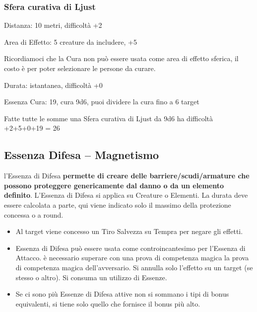 \documentclass[a4paper,11pt,twoside,openany]{book}
\begin{document}
\subsubsection{Sfera curativa di Ljust}

Distanza: 10 metri, difficoltà +2

Area di Effetto: 5 creature da includere, +5

Ricordiamoci che la Cura non può essere usata come area di effetto sferica, il costo è per poter selezionare le persone da curare.

Durata: istantanea, difficoltà +0

Essenza Cura: 19, cura 9d6, puoi dividere la cura fino a 6 target

Fatte tutte le somme una Sfera curativa di Ljust da 9d6 ha difficoltà +2+5+0+19 = 26

\pagebreak

\subsection{Essenza Difesa -- Magnetismo}

\label{essenza-difesa---magnetismo}

l'Essenza di Difesa \textbf{permette di creare delle barriere/scudi/armature che possono proteggere genericamente dal danno o da un elemento definito}. L'Essenza di Difesa si applica su Creature o Elementi. La durata deve essere calcolata a parte, qui viene indicato solo il massimo della protezione concessa o a round.
\begin{itemize}
\item 
Al target viene concesso un Tiro Salvezza su Tempra per negare gli effetti. 
\item 
Essenza di Difesa può essere usata come controincantesimo per l'Essenza di Attacco. è necessario superare con una prova di competenza magica la prova di competenza magica dell'avversario. Si annulla solo l'effetto su un target (se stesso o altro). Si consuma un utilizzo di Essenze. 
\item 
Se ci sono più Essenze di Difesa attive non si sommano i tipi di bonus equivalenti, si tiene solo quello che fornisce il bonus più alto. 
\end{itemize}

\bigskip
\end{document}
